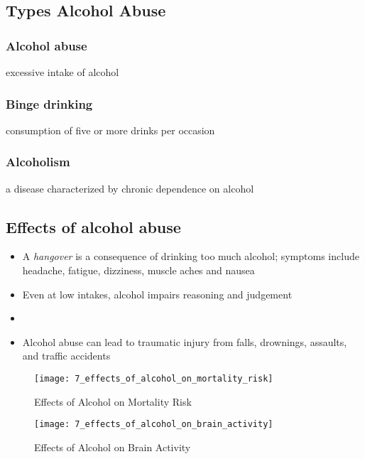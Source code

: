 \documentclass[title={Chapter 7}]{fdsn201notes}
\begin{document}
\subsection{Types Alcohol Abuse}\label{subsec:types-of-alcohol-abuse}
\subsubsection{Alcohol abuse}
excessive intake of alcohol
\subsubsection{Binge drinking}
consumption of five or more drinks per occasion
\subsubsection{Alcoholism}
a disease characterized by chronic dependence on alcohol

\subsection{Effects of alcohol abuse}\label{subsec:effects-of-alcohol-abuse}
\begin{itemize}
	\item A \emph{hangover} is a consequence of drinking too much alcohol; symptoms include headache, fatigue, dizziness, muscle aches and nausea
	\item Even at low intakes, alcohol impairs reasoning and judgement
	\item {}
	\item Alcohol abuse can lead to traumatic injury from falls, drownings, assaults, and traffic accidents
\end{itemize}

\begin{figure}[H]
	\centering
	\texttt{[image: 7\_effects\_of\_alcohol\_on\_mortality\_risk]}
	\caption{Effects of Alcohol on Mortality Risk}
	\label{fig:effects_of_alcohol_on_mortality_risk}
\end{figure}

\begin{figure}[H]
	\centering
	\texttt{[image: 7\_effects\_of\_alcohol\_on\_brain\_activity]}
	\caption{Effects of Alcohol on Brain Activity}
	\label{fig:effects_of_alcohol_on_brain_activity}
\end{figure}
\end{document}
